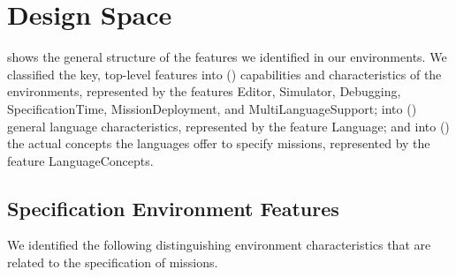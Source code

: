 \newcommand{\f}[1]{\textsf{#1}\xspace}

\newcommand{\flanguage}{\f{Language}}

\newcommand{\feditor}{\f{Editor}}
\newcommand{\fsimulator}{\f{Simulator}}
\newcommand{\fdebugging}{\f{Debugging}}
\newcommand{\fspectime}{\f{SpecificationTime}}
\newcommand{\fdeployment}{\f{MissionDeployment}}
\newcommand{\fmultilang}{\f{MultiLanguageSupport}}


\newcommand{\fsemantics}{\f{Semantics}}
\newcommand{\fnotation}{\f{Notation}}
\newcommand{\flangparadigm}{\f{LanguageParadigm}}
\newcommand{\fextensibility}{\f{Extensibility}}

\newcommand{\flangconcepts}{\f{LanguageConcepts}}


\newcommand{\fflowchart}{\f{FlowChart}}
\newcommand{\fblockly}{\f{Blockly}}


\section{Design Space}

 shows the general structure of the features we identified in our environments. 
We classified the key, top-level features into () capabilities and characteristics of the environments, represented by the features \feditor, \fsimulator, \fdebugging, \fspectime, \fdeployment, and \fmultilang; into () general language characteristics, represented by the feature \flanguage; and into () the actual concepts the languages offer to specify missions, represented by the feature \flangconcepts.


\subsection{Specification Environment Features}\label{sec:envfeatures}
\noindent
We identified the following distinguishing environment characteristics that are related to the specification of missions.

